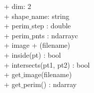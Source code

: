 {
+ dim: 2 \\
+ shape$\_$name: string \\
+ perim$\_$step : double \\
+ perim$\_$pnts : ndarrayc \\
+ image
}
{
+ \dunder(filename) \\
+ inside(pt) : bool \\
+ intersects(pt1, pt2) : bool \\
+ get$\_$image(filename) \\
+ get$\_$perim() : ndarray
}
